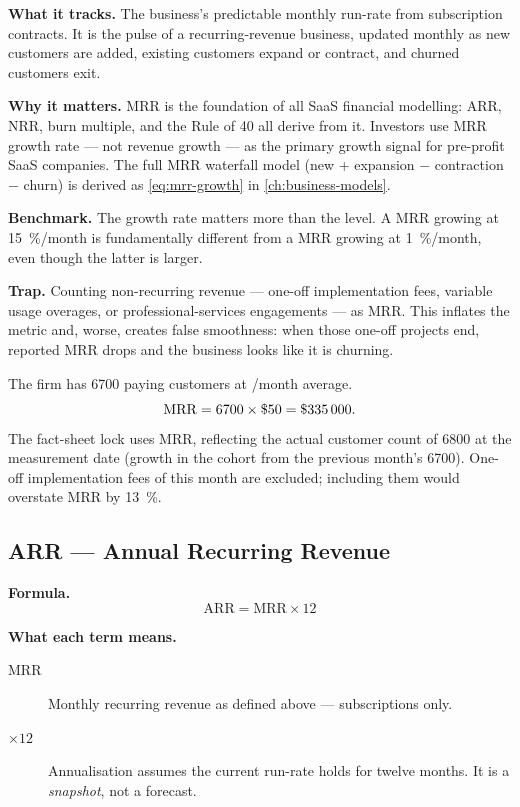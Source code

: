 \textbf{What it tracks.} The business's predictable monthly run-rate from subscription
contracts. It is the pulse of a recurring-revenue business, updated monthly as new customers
are added, existing customers expand or contract, and churned customers exit.

\textbf{Why it matters.} MRR is the foundation of all SaaS financial modelling: ARR,
NRR, burn multiple, and the Rule of 40 all derive from it. Investors use MRR growth rate ---
not revenue growth --- as the primary growth signal for pre-profit SaaS companies. The full
MRR waterfall model (new + expansion $-$ contraction $-$ churn) is derived as
\cref{eq:mrr-growth} in \cref{ch:business-models}.

\textbf{Benchmark.} The growth rate matters more than the level. A  MRR
growing at \qty{15}{\percent}/month is fundamentally different from a  MRR
growing at \qty{1}{\percent}/month, even though the latter is larger.

\textbf{Trap.} Counting non-recurring revenue --- one-off implementation fees, variable
usage overages, or professional-services engagements --- as MRR. This inflates the metric
and, worse, creates false smoothness: when those one-off projects end, reported MRR drops and
the business looks like it is churning.

\begin{example}
The firm has \num{6700} paying customers at /month average.
\[
  \mathrm{MRR} = \num{6700} \times \$\num{50} = \$\num{335000}.
\]
The fact-sheet lock uses  MRR, reflecting the actual customer count of
\num{6800} at the measurement date (growth in the cohort from the previous month's
\num{6700}). One-off implementation fees of  this month are excluded; including
them would overstate MRR by \qty{13}{\percent}.
\end{example}


\subsection{ARR --- Annual Recurring Revenue}

\textbf{Formula.}
\[
  \mathrm{ARR} = \mathrm{MRR} \times 12
\]

\textbf{What each term means.}
\begin{description}
  \item[MRR] Monthly recurring revenue as defined above --- subscriptions only.
  \item[$\times 12$] Annualisation assumes the current run-rate holds for twelve months.
    It is a \emph{snapshot}, not a forecast.
\end{description}

